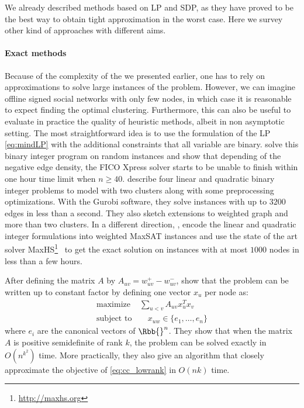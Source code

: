 We already described methods based on LP and SDP, as they have proved to be the best way to obtain
tight approximation in the worst case. Here we survey other kind of approaches with different aims.

\paragraph{Exact methods} Because of the complexity of the \pcc{} we presented earlier, one has to
rely on approximations to solve large instances of the problem. However, we can imagine offline
signed social networks with only few nodes, in which case it is reasonable to expect finding the
optimal clustering. Furthermore, this can also be useful to evaluate in practice the quality of
heuristic methods, albeit in non asymptotic setting. The most straightforward idea is to use the
formulation of the LP \eqref{eq:mindLP} with the additional constraints that all variable are
binary. \Textcite{ExactMIP13} solve this binary integer program on random instances and show that
depending of the negative edge density, the FICO Xpress solver starts to be unable to finish within
one hour time limit when $n \geq 40$.
\Textcite{Aref2016} describe four linear and quadratic  binary integer problems
to model \pcc{} with two clusters along with some preprocessing optimizations. With the Gurobi
software, they solve instances with up to $3200$ edges in less than a second. They also sketch
extensions to weighted graph and more than two clusters.
In a different direction, \textcite{Berg2015}, encode the linear and quadratic integer formulations
into weighted MaxSAT instances and use the state of the art solver
MaxHS\footnote{\href{http://www.maxhs.org/}{http://maxhs.org}}~\autocite{SATSolver13} to get the
exact solution on instances with at most $1000$ nodes in less than a few hours.

After defining the matrix $A$ by $A_{uv} = w_{uv}^+ - w_{uv}^-$, \textcite{LowRank16} show that the
\maxa{} problem can be written up to constant factor by defining one vector $x_u$ per node as:
\begin{align}
   \label{eq:cc_lowrank}
   \text{maximize } & \sum_{u<v} A_{uv}x_u^Tx_v \\
   \text{subject to}& \quad x_{uw} \in \{e_1,\ldots, e_n\} \nonumber
\end{align}
where $e_i$ are the canonical vectors of $\Rbb{}^n$. They show that when the matrix $A$ is positive
semidefinite of rank $k$, the \pcc{} problem can be solved exactly in $O(n^{k^2})$ time. More
practically, they also give an algorithm that closely approximate the objective of
\eqref{eq:cc_lowrank} in $O(nk)$ time.

